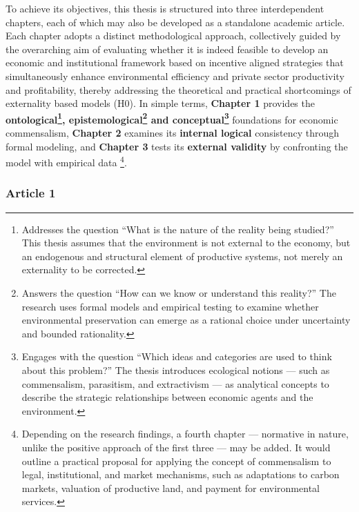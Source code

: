 To achieve its objectives, this thesis is structured into three interdependent chapters, each of which may also be developed as a standalone academic article. Each chapter adopts a distinct methodological approach, collectively guided by the overarching aim of evaluating whether it is indeed feasible to develop an economic and institutional framework based on incentive aligned strategies that simultaneously enhance environmental efficiency and private sector productivity and profitability, thereby addressing the theoretical and practical shortcomings of externality based models (H0). In simple terms, \textbf{Chapter 1} provides the \textbf{ontological\footnote{Addresses the question “What is the nature of the reality being studied?” This thesis assumes that the environment is not external to the economy, but an endogenous and structural element of productive systems, not merely an externality to be corrected.}, epistemological\footnote{Answers the question “How can we know or understand this reality?” The research uses formal models and empirical testing to examine whether environmental preservation can emerge as a rational choice under uncertainty and bounded rationality.} and conceptual\footnote{Engages with the question “Which ideas and categories are used to think about this problem?” The thesis introduces ecological notions — such as commensalism, parasitism, and extractivism — as analytical concepts to describe the strategic relationships between economic agents and the environment.}} foundations for economic commensalism, \textbf{Chapter 2} examines its \textbf{internal logical} consistency through formal modeling, and \textbf{Chapter 3} tests its \textbf{external validity} by confronting the model with empirical data \footnote{Depending on the research findings, a fourth chapter — normative in nature, unlike the positive approach of the first three — may be added. It would outline a practical proposal for applying the concept of commensalism to legal, institutional, and market mechanisms, such as adaptations to carbon markets, valuation of productive land, and payment for environmental services.}.

\subsubsection{Article 1}

